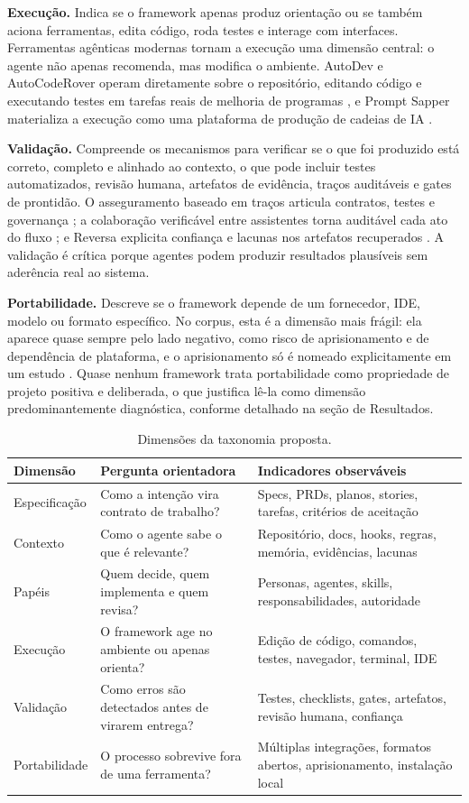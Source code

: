 \noindent\textbf{Execução.} Indica se o framework apenas produz orientação ou se também aciona ferramentas, edita código, roda testes e interage com interfaces. Ferramentas agênticas modernas tornam a execução uma dimensão central: o agente não apenas recomenda, mas modifica o ambiente. AutoDev e AutoCodeRover operam diretamente sobre o repositório, editando código e executando testes em tarefas reais de melhoria de programas \cite{MicheleTufano2024,YuntongZhang2024}, e Prompt Sapper materializa a execução como uma plataforma de produção de cadeias de IA \cite{YuCheng2023}.

\noindent\textbf{Validação.} Compreende os mecanismos para verificar se o que foi produzido está correto, completo e alinhado ao contexto, o que pode incluir testes automatizados, revisão humana, artefatos de evidência, traços auditáveis e gates de prontidão. O asseguramento baseado em traços articula contratos, testes e governança \cite{Paduraru2026}; a colaboração verificável entre assistentes torna auditável cada ato do fluxo \cite{Merchant2025}; e Reversa explicita confiança e lacunas nos artefatos recuperados \cite{Macedo2026}. A validação é crítica porque agentes podem produzir resultados plausíveis sem aderência real ao sistema.

\noindent\textbf{Portabilidade.} Descreve se o framework depende de um fornecedor, IDE, modelo ou formato específico. No corpus, esta é a dimensão mais frágil: ela aparece quase sempre pelo lado negativo, como risco de aprisionamento e de dependência de plataforma, e o aprisionamento só é nomeado explicitamente em um estudo \cite{SeyedmoeinMohsenimofidi2025}. Quase nenhum framework trata portabilidade como propriedade de projeto positiva e deliberada, o que justifica lê-la como dimensão predominantemente diagnóstica, conforme detalhado na seção de Resultados.

\begin{table}[h!]
\centering
\caption{Dimensões da taxonomia proposta.}
\label{tab:taxonomia}
\small
\begin{tabularx}{\textwidth}{p{2.8cm}Y Y}
\toprule
\textbf{Dimensão} & \textbf{Pergunta orientadora} & \textbf{Indicadores observáveis} \\
\midrule
Especificação & Como a intenção vira contrato de trabalho? & Specs, PRDs, planos, stories, tarefas, critérios de aceitação \\
Contexto & Como o agente sabe o que é relevante? & Repositório, docs, hooks, regras, memória, evidências, lacunas \\
Papéis & Quem decide, quem implementa e quem revisa? & Personas, agentes, skills, responsabilidades, autoridade \\
Execução & O framework age no ambiente ou apenas orienta? & Edição de código, comandos, testes, navegador, terminal, IDE \\
Validação & Como erros são detectados antes de virarem entrega? & Testes, checklists, gates, artefatos, revisão humana, confiança \\
Portabilidade & O processo sobrevive fora de uma ferramenta? & Múltiplas integrações, formatos abertos, aprisionamento, instalação local \\
\bottomrule
\end{tabularx}
\end{table}
